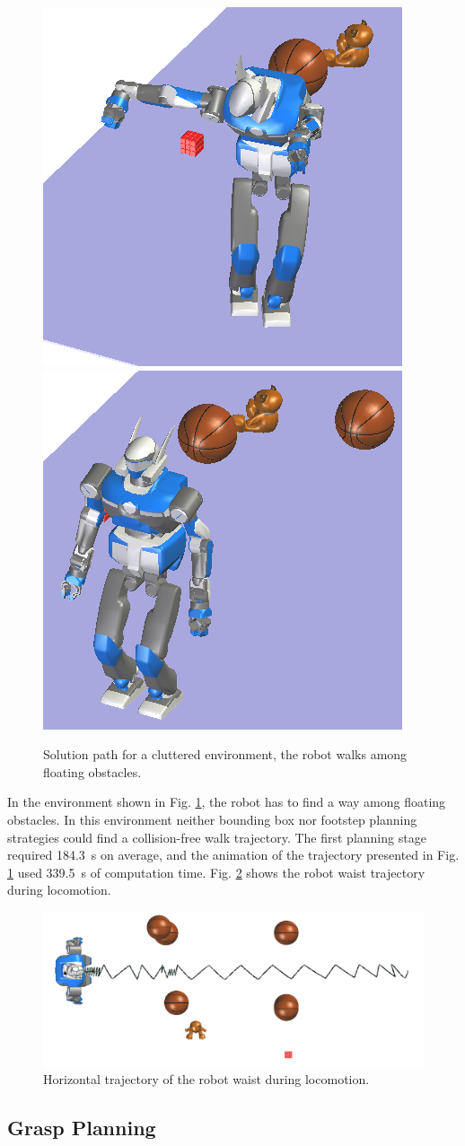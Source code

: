 \documentclass{article}
\begin{document}
\begin{figure}[h!]
\includegraphics[width=0.24\linewidth]{pics/objects-cloud/perspective-7.png}
\includegraphics[width=0.24\linewidth]{pics/objects-cloud/perspective-8.png}

\caption{Solution path for a cluttered environment, the robot walks
  among floating obstacles.}
\label{fig:cluttered}
\end{figure}

In the environment shown in Fig. \ref{fig:cluttered}, the robot
has to find a way among floating obstacles. In this
environment neither bounding box nor footstep planning strategies
could find a collision-free walk trajectory.
The first planning stage required
184.3~s on average, and the animation of the trajectory presented in 
Fig. \ref{fig:cluttered} used 339.5~s of computation time. Fig. \ref{fig:cluttered-waist} 
shows the robot waist trajectory during locomotion.

\begin{figure}[h!]
  \centering
  \includegraphics[width=0.7\linewidth]{pics/objects-cloud/waist-trajectory.png}

  \caption{Horizontal trajectory of the robot waist during
    locomotion.}
  \label{fig:cluttered-waist} 
\end{figure}


\subsection{Grasp Planning}
\end{document}

